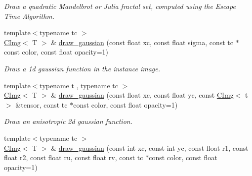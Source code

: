 \begin{DoxyCompactItemize}
\begin{DoxyCompactList}\small\item\em Draw a quadratic Mandelbrot or Julia fractal set, computed using the Escape Time Algorithm. \item\end{DoxyCompactList}\item 
{\footnotesize template$<$typename tc $>$ }\\\hyperlink{structcimg__library_1_1CImg}{CImg}$<$ T $>$ \& \hyperlink{structcimg__library_1_1CImg_ac27a8c4da38899f60456ea7d3535915b}{draw\_\-gaussian} (const float xc, const float sigma, const tc $\ast$const color, const float opacity=1)
\begin{DoxyCompactList}\small\item\em Draw a 1d gaussian function in the instance image. \item\end{DoxyCompactList}\item 
{\footnotesize template$<$typename t , typename tc $>$ }\\\hyperlink{structcimg__library_1_1CImg}{CImg}$<$ T $>$ \& \hyperlink{structcimg__library_1_1CImg_aa56c60d556b1a888a4e3c6caee5a7f84}{draw\_\-gaussian} (const float xc, const float yc, const \hyperlink{structcimg__library_1_1CImg}{CImg}$<$ t $>$ \&tensor, const tc $\ast$const color, const float opacity=1)
\begin{DoxyCompactList}\small\item\em Draw an anisotropic 2d gaussian function. \item\end{DoxyCompactList}\item 
\hypertarget{structcimg__library_1_1CImg_a9e7bd32ea10f9743f841668161162cfd}{
{\footnotesize template$<$typename tc $>$ }\\\hyperlink{structcimg__library_1_1CImg}{CImg}$<$ T $>$ \& \hyperlink{structcimg__library_1_1CImg_a9e7bd32ea10f9743f841668161162cfd}{draw\_\-gaussian} (const int xc, const int yc, const float r1, const float r2, const float ru, const float rv, const tc $\ast$const color, const float opacity=1)}
\label{structcimg__library_1_1CImg_a9e7bd32ea10f9743f841668161162cfd}


\end{DoxyCompactItemize}
